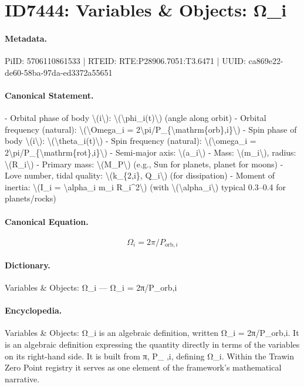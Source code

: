 \section*{ID7444: Variables \& Objects: Ω\_i}
\paragraph{Metadata.}
PiID: 5706110861533 | RTEID: RTE:P28906.7051:T3.6471 | UUID: ca869e22-de60-58ba-97da-ed3372a55651

\paragraph{Canonical Statement.}
- Orbital phase of body \textbackslash{}(i\textbackslash{}): \textbackslash{}(\textbackslash{}phi\_i(t)\textbackslash{}) (angle along orbit) - Orbital frequency (natural): \textbackslash{}(\textbackslash{}Omega\_i = 2\textbackslash{}pi/P\_\{\textbackslash{}mathrm\{orb\},i\}\textbackslash{}) - Spin phase of body \textbackslash{}(i\textbackslash{}): \textbackslash{}(\textbackslash{}theta\_i(t)\textbackslash{}) - Spin frequency (natural): \textbackslash{}(\textbackslash{}omega\_i = 2\textbackslash{}pi/P\_\{\textbackslash{}mathrm\{rot\},i\}\textbackslash{}) - Semi-major axis: \textbackslash{}(a\_i\textbackslash{}) - Mass: \textbackslash{}(m\_i\textbackslash{}), radius: \textbackslash{}(R\_i\textbackslash{}) - Primary mass: \textbackslash{}(M\_P\textbackslash{}) (e.g., Sun for planets, planet for moons) - Love number, tidal quality: \textbackslash{}(k\_\{2,i\}, Q\_i\textbackslash{}) (for dissipation) - Moment of inertia: \textbackslash{}(I\_i = \textbackslash{}alpha\_i m\_i R\_i\textasciicircum{}2\textbackslash{}) (with \textbackslash{}(\textbackslash{}alpha\_i\textbackslash{}) typical 0.3–0.4 for planets/rocks)

\paragraph{Canonical Equation.}
\[
\Omega_i = 2\pi/P_{\mathrm{orb},i}
\]

\paragraph{Dictionary.}
Variables \& Objects: Ω\_i — Ω\_i = 2π/P\_orb,i

\paragraph{Encyclopedia.}
Variables \& Objects: Ω\_i is an algebraic definition, written Ω\_i = 2π/P\_orb,i. It is an algebraic definition expressing the quantity directly in terms of the variables on its right-hand side. It is built from π, P\_ ,i, defining Ω\_i. Within the Trawin Zero Point registry it serves as one element of the framework's mathematical narrative.
